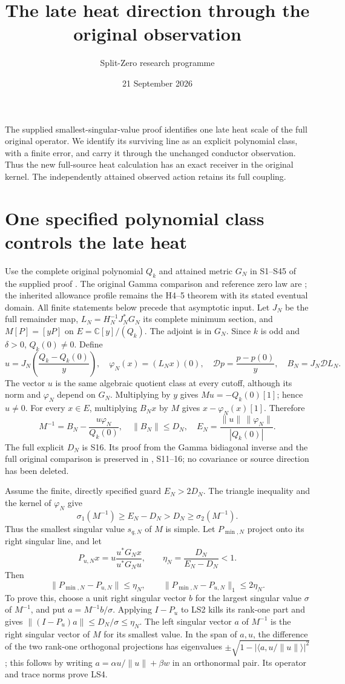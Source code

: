 \documentclass[11pt]{article}
\title{The late heat direction through the original observation}
\author{Split-Zero research programme}
\date{21 September 2026}
\newcommand{\C}{\mathbb C}
\newcommand{\norm}[1]{\lVert#1\rVert}
\begin{document}
\maketitle
The supplied smallest-singular-value proof identifies one late heat
scale of the full original operator. We identify its surviving line
as an explicit polynomial class, with a finite error, and carry it
through the unchanged conductor observation. Thus the new full-source
heat calculation has an exact receiver in the original kernel.
The independently attained observed action retains its full coupling.

\section{One specified polynomial class controls the late heat}
Use the complete original polynomial $Q_k$ and attained metric $G_N$
in S1--S45 of the supplied proof \cite{Smallest}. The original
Gamma comparison and reference zero law are
\cite[NG2--3, NG6--16]{NG}; the inherited allowance profile remains
the H4--5 theorem with its stated eventual domain.
All finite statements below precede that asymptotic input.
Let $J_N$ be the full remainder map,
$L_N=H_N^{-1}J_N^*G_N$ its complete minimum section, and
$M[P]=[yP]$ on $E=\C[y]/(Q_k)$. The adjoint is in $G_N$.
Since $k$ is odd and $\delta>0$, $Q_k(0)\ne0$. Define
\[
u=J_N\!\left(\frac{Q_k-Q_k(0)}y\right),\quad
\varphi_N(x)=(L_Nx)(0),\quad
\mathscr Dp=\frac{p-p(0)}y,\quad
B_N=J_N\mathscr D L_N.
\tag{LS1}
\]
The vector $u$ is the same algebraic quotient class at every
cutoff, although its norm and $\varphi_N$ depend on $G_N$.
Multiplying by $y$ gives $Mu=-Q_k(0)[1]$; hence $u\ne0$.
For every $x\in E$, multiplying $B_Nx$ by $M$ gives
$x-\varphi_N(x)[1]$. Therefore
\[
M^{-1}=B_N-\frac{u\varphi_N}{Q_k(0)},\quad
\norm{B_N}\le D_N,\quad
E_N=\frac{\norm u\,\norm{\varphi_N}}{|Q_k(0)|}.
\tag{LS2}
\]
The full explicit $D_N$ is S16. Its proof from the Gamma
bidiagonal inverse and the full original comparison is preserved
in \cite{Smallest}, S11--16; no covariance or source direction
has been deleted.

Assume the finite, directly specified guard $E_N>2D_N$.
The triangle inequality and the kernel of $\varphi_N$ give
\[
\sigma_1(M^{-1})\ge E_N-D_N>D_N\ge\sigma_2(M^{-1}).
\tag{LS3}
\]
Thus the smallest singular value $s_{q,N}$ of $M$ is simple.
Let $P_{\min,N}$ project onto its right singular line, and let
\[
P_{u,N}x=u\frac{u^*G_Nx}{u^*G_Nu},\qquad
\eta_N=\frac{D_N}{E_N-D_N}<1.
\]
Then
\[
\boxed{\norm{P_{\min,N}-P_{u,N}}\le\eta_N,\qquad
\norm{P_{\min,N}-P_{u,N}}_1\le2\eta_N.}
\tag{LS4}
\]
To prove this, choose a unit right singular vector $b$ for the largest
singular value $\sigma$ of $M^{-1}$, and put
$a=M^{-1}b/\sigma$. Applying $I-P_u$ to LS2 kills its rank-one
part and gives $\norm{(I-P_u)a}\le D_N/\sigma\le\eta_N$.
The left singular vector $a$ of $M^{-1}$ is the right singular
vector of $M$ for its smallest value. In the span of $a,u$,
the difference of the two rank-one orthogonal projections has
eigenvalues $\pm\sqrt{1-|\langle a,u/\norm u\rangle|^2}$;
this follows by writing $a=\alpha u/\norm u+\beta w$
in an orthonormal pair. Its operator and trace norms prove LS4.
\end{document}
